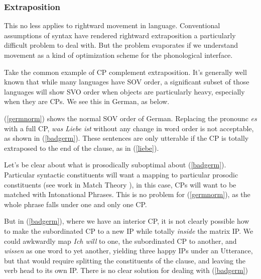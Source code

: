 \documentclass{article}
\begin{document}
\subsubsection{Extraposition}

This no less applies to rightward movement in language. Conventional assumptions of syntax have rendered rightward extraposition a particularly difficult problem to deal with. But the problem evaporates if we understand movement as a kind of optimization scheme for the phonological interface.

Take the common example of CP complement extraposition. It's generally well known that while many languages have SOV order, a significant subset of those languages will show SVO order when objects are particularly heavy, especially when they are CPs. We see this in German, as below.

\begin{exe}
\ex\begin{xlist}
\end{xlist}
\end{exe}

(\ref{germnorm}) shows the normal SOV order of German. Replacing the pronounc \textit{es} with a full CP, \textit{was Liebe ist} without any change in word order is not acceptable, as shown in (\ref{badgerm}). These sentences are only utterable if the CP is totally extraposed to the end of the clause, as in (\ref{liebe}).

Let's be clear about what is prosodically suboptimal about (\ref{badgerm}). Particular syntactic constituents will want a mapping to particular prosodic constituents (see work in Match Theory \citep{selkirk11}), in this case, CPs will want to be matched with Intonational Phrases. This is no problem for (\ref{germnorm}), as the whole phrase falls under one and only one CP.

But in (\ref{badgerm}), where we have an interior CP, it is not clearly possible how to make the subordinated CP to a new IP while totally \emph{inside} the matrix IP. We could awkwardly map \emph{Ich will} to one, the subordinated CP to another, and \emph{wissen} as one word to yet another, yielding three happy IPs under an Utterance, but that would require splitting the constituents of the clause, and leaving the verb head to its own IP. There is no clear solution for dealing with (\ref{badgerm})
\end{document}
